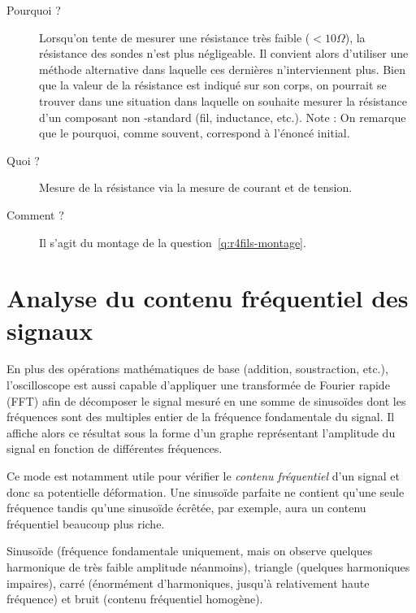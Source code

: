 \documentclass{../template/labo}
\begin{document}
{
	\begin{description}
		\item[Pourquoi ?] Lorsqu'on tente de mesurer une résistance très faible ($<10\Omega$), la résistance des sondes n'est plus négligeable. Il convient alors d'utiliser une méthode alternative dans laquelle ces dernières n'interviennent plus. Bien que la valeur de la résistance est indiqué sur son corps, on pourrait se trouver dans une situation dans laquelle on souhaite mesurer la résistance d'un composant non -standard (fil, inductance, etc.).
		Note : On remarque que le pourquoi, comme souvent, correspond à l'énoncé initial.
		\item[Quoi ?] Mesure de la résistance via la mesure de courant et de tension.
		\item[Comment ?] Il s'agit du montage de la question~\ref{q:r4fils-montage}.
	\end{description}
}

\section{Analyse du contenu fréquentiel des signaux}
En plus des opérations mathématiques de base (addition, soustraction, etc.), l'oscilloscope est aussi capable d'appliquer une transformée de Fourier rapide (FFT) afin de décomposer le signal mesuré en une somme de sinusoïdes dont les fréquences sont des multiples entier de la fréquence fondamentale du signal.
Il affiche alors ce résultat sous la forme d'un graphe représentant l'amplitude du signal en fonction de différentes fréquences.

Ce mode est notamment utile pour vérifier le \textit{contenu fréquentiel} d'un signal et donc sa potentielle déformation.
Une sinusoïde parfaite ne contient qu'une seule fréquence tandis qu'une sinusoïde écrêtée, par exemple, aura un contenu fréquentiel beaucoup plus riche.

{
	Sinusoïde (fréquence fondamentale uniquement, mais on observe quelques harmonique de très faible amplitude néanmoins), triangle (quelques harmoniques impaires), carré (énormément d'harmoniques, jusqu'à relativement haute fréquence) et bruit (contenu fréquentiel homogène).
}
\end{document}
